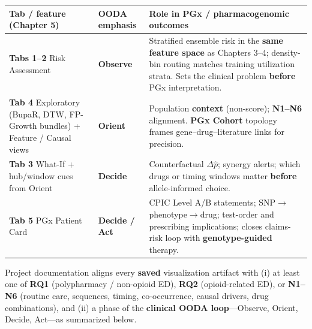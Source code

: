 \documentclass[
  12pt,
]{book}
\begin{document}
\begin{longtable}[]{@{}
  >{\raggedright\arraybackslash}p{}
  >{\raggedright\arraybackslash}p{}
  >{\raggedright\arraybackslash}p{}@{}}
\toprule\noalign{}
\begin{minipage}[b]{\linewidth}\raggedright
Tab / feature (Chapter 5)
\end{minipage} & \begin{minipage}[b]{\linewidth}\raggedright
OODA emphasis
\end{minipage} & \begin{minipage}[b]{\linewidth}\raggedright
Role in PGx / pharmacogenomic outcomes
\end{minipage} \\
\midrule\noalign{}
\endhead
\bottomrule\noalign{}
\endlastfoot
\textbf{Tabs 1--2} Risk Assessment & \textbf{Observe} & Stratified
ensemble risk in the \textbf{same feature space} as Chapters 3--4;
density-bin routing matches training utilization strata. Sets the
clinical problem \textbf{before} PGx interpretation. \\
\textbf{Tab 4} Exploratory (BupaR, DTW, FP-Growth bundles) + Feature /
Causal views & \textbf{Orient} & Population \textbf{context}
(non-score); \textbf{N1--N6} alignment. \textbf{PGx Cohort} topology
frames gene--drug--literature links for precision. \\
\textbf{Tab 3} What-If + hub/window cues from Orient & \textbf{Decide} &
Counterfactual \(\Delta\hat{p}\); synergy alerts; which drugs or timing
windows matter \textbf{before} allele-informed choice. \\
\textbf{Tab 5} PGx Patient Card & \textbf{Decide / Act} & CPIC Level A/B
statements; SNP\(\rightarrow\)phenotype\(\rightarrow\)drug; test-order
and prescribing implications; closes claims-risk loop with
\textbf{genotype-guided} therapy. \\
\end{longtable}

Project documentation aligns every \textbf{saved} visualization artifact
with (i) at least one of \textbf{RQ1} (polypharmacy / non-opioid ED),
\textbf{RQ2} (opioid-related ED), or \textbf{N1--N6} (routine care,
sequences, timing, co-occurrence, causal drivers, drug combinations),
and (ii) a phase of the \textbf{clinical OODA loop}---Observe, Orient,
Decide, Act---as summarized below.
\end{document}
